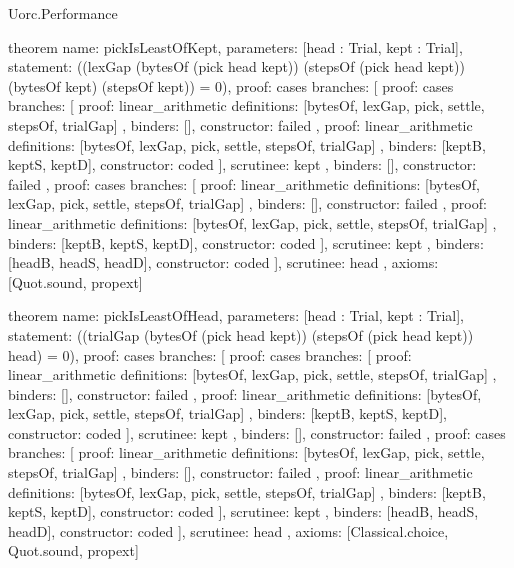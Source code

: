\begin{lexlean}{Uorc.Performance}
\begin{semanticmodule}
theorem{
  name: pickIsLeastOfKept,
  parameters: [head : Trial, kept : Trial],
  statement: ((lexGap (bytesOf (pick head kept)) (stepsOf (pick head kept)) (bytesOf kept) (stepsOf kept)) = 0),
  proof: cases{
    branches: [
      {
        proof: cases{
          branches: [
            {
              proof: linear_arithmetic{
                definitions: [bytesOf, lexGap, pick, settle, stepsOf, trialGap]
              },
              binders: [],
              constructor: failed
            },
            {
              proof: linear_arithmetic{
                definitions: [bytesOf, lexGap, pick, settle, stepsOf, trialGap]
              },
              binders: [keptB, keptS, keptD],
              constructor: coded
            }
          ],
          scrutinee: kept
        },
        binders: [],
        constructor: failed
      },
      {
        proof: cases{
          branches: [
            {
              proof: linear_arithmetic{
                definitions: [bytesOf, lexGap, pick, settle, stepsOf, trialGap]
              },
              binders: [],
              constructor: failed
            },
            {
              proof: linear_arithmetic{
                definitions: [bytesOf, lexGap, pick, settle, stepsOf, trialGap]
              },
              binders: [keptB, keptS, keptD],
              constructor: coded
            }
          ],
          scrutinee: kept
        },
        binders: [headB, headS, headD],
        constructor: coded
      }
    ],
    scrutinee: head
  },
  axioms: [Quot.sound, propext]
}

theorem{
  name: pickIsLeastOfHead,
  parameters: [head : Trial, kept : Trial],
  statement: ((trialGap (bytesOf (pick head kept)) (stepsOf (pick head kept)) head) = 0),
  proof: cases{
    branches: [
      {
        proof: cases{
          branches: [
            {
              proof: linear_arithmetic{
                definitions: [bytesOf, lexGap, pick, settle, stepsOf, trialGap]
              },
              binders: [],
              constructor: failed
            },
            {
              proof: linear_arithmetic{
                definitions: [bytesOf, lexGap, pick, settle, stepsOf, trialGap]
              },
              binders: [keptB, keptS, keptD],
              constructor: coded
            }
          ],
          scrutinee: kept
        },
        binders: [],
        constructor: failed
      },
      {
        proof: cases{
          branches: [
            {
              proof: linear_arithmetic{
                definitions: [bytesOf, lexGap, pick, settle, stepsOf, trialGap]
              },
              binders: [],
              constructor: failed
            },
            {
              proof: linear_arithmetic{
                definitions: [bytesOf, lexGap, pick, settle, stepsOf, trialGap]
              },
              binders: [keptB, keptS, keptD],
              constructor: coded
            }
          ],
          scrutinee: kept
        },
        binders: [headB, headS, headD],
        constructor: coded
      }
    ],
    scrutinee: head
  },
  axioms: [Classical.choice, Quot.sound, propext]
}


\end{semanticmodule}
\end{lexlean}

